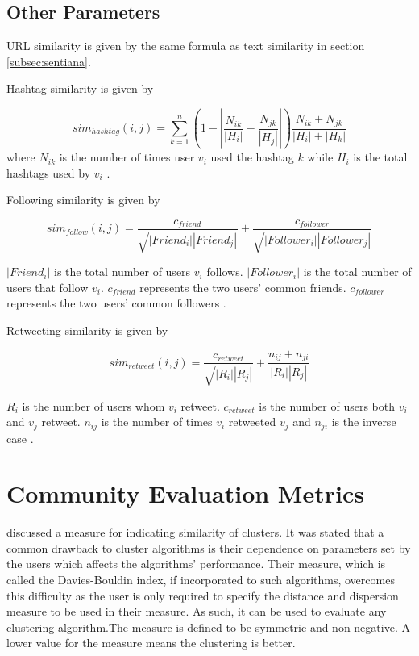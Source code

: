 \subsection{Other Parameters}


URL similarity is given by the same formula as text similarity in section \ref{subsec:sentiana}.


Hashtag similarity is given by 


\begin{equation}
	sim_{hashtag}(i,j) = \sum_{k=1}^n (1 - \left|{\frac{N_{ik}}{\left|{H_i}\right|} - \frac{N_{jk}}{\left|{H_j}\right|}}\right|)\frac{N_{ik} + N_{jk}}{\left|{H_i}\right| + \left|{H_k}\right|}
\end{equation}where $N_{ik}$ is the number of times user $v_i$ used the hashtag $k$ while $H_i$ is the total hashtags used by $v_i$ \cite{Zhang:2012}.


Following similarity is given by 


\begin{equation}
	sim_{follow}(i,j) = \frac{c_{friend}}{\sqrt{\left|{Friend_i}\right|\left|{Friend_j}\right|}} + \frac{c_{follower}}{\sqrt{\left|{Follower_i}\right|\left|{Follower_j}\right|}}
\end{equation}


$\left|{Friend_i}\right|$ is the total number of users $v_i$ follows. $\left|{Follower_i}\right|$ is the total number of users that follow $v_i$. $c_{friend}$ represents the two users’ common friends. $c_{follower}$ represents the two users’ common followers \cite{Zhang:2012}.


Retweeting similarity is given by 


\begin{equation}
	sim_{retweet}(i,j) = \frac{c_{retweet}}{\sqrt{\left|{R_i}\right|\left|{R_j}\right|}} + \frac{n_{ij} + n_{ji}}{\left|{R_i}\right|\left|{R_j}\right|}
\end{equation}


$R_i$ is the number of users whom $v_i$ retweet. $c_{retweet}$ is the number of users both $v_i$ and $v_j$ retweet. $n_{ij}$ is the number of times $v_i$ retweeted $v_j$ and $n_{ji}$ is the inverse case \cite{Zhang:2012}. 


\section{Community Evaluation Metrics}

 discussed a measure for indicating similarity of clusters. It was stated that a common drawback to cluster algorithms is their dependence on parameters set by the users which affects the algorithms' performance. Their measure, which is called the Davies-Bouldin index, if incorporated to such algorithms, overcomes this difficulty as the user is only required to specify the distance and dispersion measure to be used in their measure. As such, it can be used to evaluate any clustering algorithm.The measure is defined to be symmetric and non-negative. A lower value for the measure means the clustering is better.

